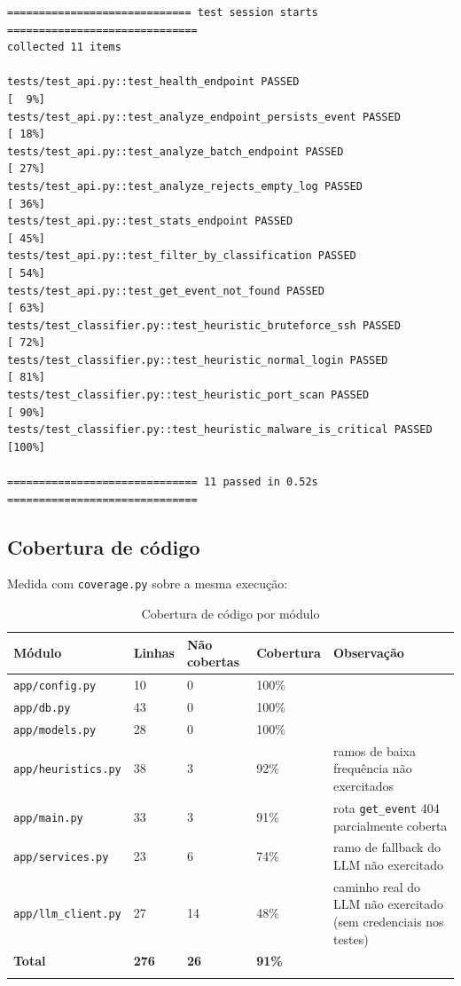 \documentclass[11pt,a4paper]{article}
\begin{document}
\begin{lstlisting}
============================= test session starts ==============================
collected 11 items

tests/test_api.py::test_health_endpoint PASSED                           [  9%]
tests/test_api.py::test_analyze_endpoint_persists_event PASSED           [ 18%]
tests/test_api.py::test_analyze_batch_endpoint PASSED                    [ 27%]
tests/test_api.py::test_analyze_rejects_empty_log PASSED                 [ 36%]
tests/test_api.py::test_stats_endpoint PASSED                            [ 45%]
tests/test_api.py::test_filter_by_classification PASSED                  [ 54%]
tests/test_api.py::test_get_event_not_found PASSED                       [ 63%]
tests/test_classifier.py::test_heuristic_bruteforce_ssh PASSED           [ 72%]
tests/test_classifier.py::test_heuristic_normal_login PASSED             [ 81%]
tests/test_classifier.py::test_heuristic_port_scan PASSED                [ 90%]
tests/test_classifier.py::test_heuristic_malware_is_critical PASSED      [100%]

============================== 11 passed in 0.52s ==============================
\end{lstlisting}

\subsection{Cobertura de código}

Medida com \texttt{coverage.py} sobre a mesma execução:

\begin{longtable}{p{4.5cm}p{1.6cm}p{1.6cm}p{1.6cm}p{4cm}}
\toprule
\textbf{Módulo} & \textbf{Linhas} & \textbf{Não cobertas} & \textbf{Cobertura} & \textbf{Observação} \\
\midrule
\endhead
\texttt{app/config.py} & 10 & 0 & 100\% & \\
\texttt{app/db.py} & 43 & 0 & 100\% & \\
\texttt{app/models.py} & 28 & 0 & 100\% & \\
\texttt{app/heuristics.py} & 38 & 3 & 92\% & ramos de baixa frequência não exercitados \\
\texttt{app/main.py} & 33 & 3 & 91\% & rota \texttt{get\_event} 404 parcialmente coberta \\
\texttt{app/services.py} & 23 & 6 & 74\% & ramo de fallback do LLM não exercitado \\
\texttt{app/llm\_client.py} & 27 & 14 & 48\% & caminho real do LLM não exercitado (sem credenciais nos testes) \\
\midrule
\textbf{Total} & \textbf{276} & \textbf{26} & \textbf{91\%} & \\
\bottomrule
\caption{Cobertura de código por módulo}
\end{longtable}
\end{document}
